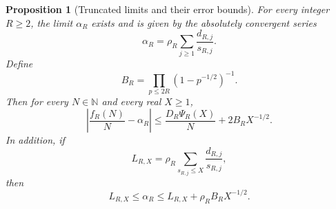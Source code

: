 \documentclass[11pt]{article}
\newtheorem{proposition}[theorem]{Proposition}
\theoremstyle{definition}
\theoremstyle{remark}
\numberwithin{equation}{section}
\newcommand{\N}{\mathbb N}
\begin{document}
\begin{proposition}[Truncated limits and their error bounds]
\label{prop:truncated-limit}
For every integer \(R\ge2\), the limit \(\alpha_R\) exists and is
given by the absolutely convergent series
\begin{equation}\label{eq:alphaR-series}
 \alpha_R=\rho_R\sum_{j\ge1}\frac{d_{R,j}}{s_{R,j}}.
\end{equation}
Define
\begin{equation}\label{eq:B}
 B_R=\prod_{p\le2R}(1-p^{-1/2})^{-1}.
\end{equation}
Then for every \(N\in\N\) and every real \(X\ge1\),
\begin{equation}\label{eq:truncated-error}
 \left|\frac{f_R(N)}N-\alpha_R\right|
 \le\frac{D_R\Psi_R(X)}N+2B_RX^{-1/2}.
\end{equation}
In addition, if
\begin{equation}\label{eq:L}
 L_{R,X}=\rho_R
          \sum_{s_{R,j}\le X}\frac{d_{R,j}}{s_{R,j}},
\end{equation}
then
\begin{equation}\label{eq:finite-alphaR}
 L_{R,X}\le\alpha_R
 \le L_{R,X}+\rho_RB_RX^{-1/2}.
\end{equation}
\end{proposition}
\end{document}
